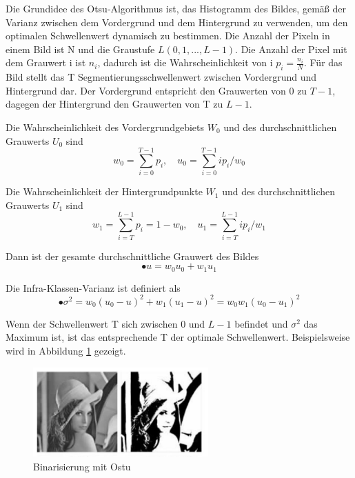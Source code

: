 Die Grundidee des Otsu-Algorithmus ist, das Histogramm des Bildes, gemäß der Varianz zwischen dem Vordergrund und dem Hintergrund zu verwenden, um den optimalen Schwellenwert dynamisch zu bestimmen. Die Anzahl der Pixeln in einem Bild ist N und die Graustufe $ L(0,1,...,L-1) $. Die Anzahl der Pixel mit dem Grauwert i ist $ n_{i} $, dadurch ist die Wahrscheinlichkeit von i $ p_{i} = \frac{n_{i}}{N} $. Für das Bild stellt das T Segmentierungsschwellenwert zwischen Vordergrund und Hintergrund dar. Der Vordergrund entspricht den Grauwerten von 0 zu $ T-1 $, dagegen der Hintergrund den Grauwerten von T zu $ L -1 $.

Die Wahrscheinlichkeit des Vordergrundgebiets $ W_{0} $ und des durchschnittlichen Grauwerts $ U_{0} $ sind
\begin{equation}
  w_{0} = \sum_{i=0}^{T-1} p_{i},\quad u_{0} = \sum_{i=0}^{T-1} ip_{i}/w_{0}
\end{equation}

Die Wahrscheinlichkeit der Hintergrundpunkte $ W_{1} $ und des durchschnittlichen Grauwerts $ U_{1} $ sind
\begin{equation}
  w_{1} = \sum_{i=T}^{L-1} p_{i} = 1-w_{0},\quad u_{1} = \sum_{i=T}^{L-1} ip_{i}/w_{1}
\end{equation}

Dann ist der gesamte durchschnittliche Grauwert des Bildes
\begin{equation}
• u = w_{0}u_{0} + w_{1}u_{1}
\end{equation}

Die Infra-Klassen-Varianz ist definiert als
\begin{equation}
•\sigma^2 = w_{0}(u_{0} - u)^2 + w_{1}(u_{1} - u)^2 = w_{0}w_{1}(u_{0} - u_{1})^2
\end{equation}

Wenn der Schwellenwert T sich zwischen 0 und $ L-1 $ befindet und $ \sigma^2 $ das Maximum ist, ist das entsprechende T der optimale Schwellenwert. Beispielsweise wird in Abbildung \ref{fig:Binarisierung mit globalen Schwellenwertmethode} gezeigt.

\begin{figure}[H]
 \centering 
  \includegraphics[keepaspectratio,width=0.6\textwidth]{images/4_ZweiteErfahrung/Binar/Ostu.pdf}
 \caption{Binarisierung mit Ostu}
 \label{fig:Binarisierung mit globalen Schwellenwertmethode}
\end{figure} 

